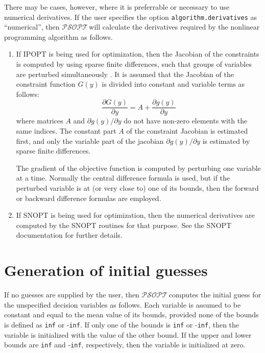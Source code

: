 \documentclass[a4paper,11pt]{report}    %
\newcommand{\psopt}{$\mathcal{PSOPT}$\,}  %
\begin{document}
There may be cases, however, where it is preferrable or necessary to use numerical derivatives. 
If the user specifies the option \texttt{algorithm.derivatives} as ``numerical'', then \psopt will calculate
the derivatives required by the nonlinear programming algorithm as follows.

\begin{enumerate}
 \item If IPOPT is being used for optimization, then the Jacobian of the constraints is computed by using sparse finite differences,
such that groups of variables are perturbed simultaneously \cite{curtis:74}.  It is assumed that the
Jacobian of the constraint function $G(y)$ is divided into constant and variable terms as follows:
\begin{equation}
  \frac{\partial G( y )}{\partial y}  = A + \frac{\partial g(y)}{\partial y}
\end{equation}
where matrices $A$ and $\partial g(y)/{\partial y}$ do not have non-zero elements with the same indices. The constant part $A$ of the constraint Jacobian is estimated
first, and only the variable part of the jacobian $\partial g(y)/{\partial y}$ is estimated by sparse finite differences.


The gradient of the objective function
is computed by perturbing one variable at a time. Normally the central difference formula
is used, but if the perturbed variable is at (or very close to) one of its bounds, then the forward or backward difference
formulas are employed.
 \item If SNOPT is being used for optimization, then the numerical derivatives are computed by the 
SNOPT routines for that purpose. See the SNOPT documentation for further details.
\end{enumerate}

\section{Generation of initial guesses}

If no guesses are supplied by the user, then \psopt computes the initial guess for the unspecified decision
variables as follows. Each variable is assumed to be constant and equal to the mean value of its bounds, provided
none of the bounds is defined as \texttt{inf} or -\texttt{inf}. If only one of the bounds is \texttt{inf} or -\texttt{inf}, then the variable is initialized
with the value of the other bound. If the upper and lower  bounds are \texttt{inf} and -\texttt{inf}, respectively, then the variable is initialized at zero.
\end{document}
